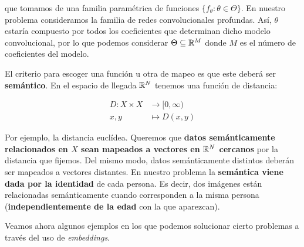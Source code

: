 que tomamos de una familia paramétrica de funciones $\{f_{\theta}: \theta \in \Theta \}$. En nuestro problema consideramos la familia de redes convolucionales profundas. Así, $\theta$ estaría compuesto por todos los coeficientes que determinan dicho modelo convolucional, por lo que podemos considerar $\Theta \subseteq \mathbb{R}^M$ donde $M$ es el número de coeficientes del modelo.

El criterio para escoger una función u otra de mapeo es que este deberá ser \textbf{semántico}. En el espacio de llegada $\mathbb{R}^N$ tenemos una función de distancia:

\begin{equation}
\begin{split}
    D: X \times X & \to [0, \infty) \\
    x, y & \mapsto D(x, y)
\end{split}
\end{equation}

Por ejemplo, la distancia euclídea. Queremos que \textbf{datos semánticamente relacionados en $X$ sean mapeados a vectores en $\mathbb{R}^N$ cercanos} por la distancia que fijemos. Del mismo modo, datos semánticamente distintos deberán ser mapeados a vectores distantes. En nuestro problema la \textbf{semántica viene dada por la identidad} de cada persona. Es decir, dos imágenes están relacionadas semánticamente cuando corresponden a la misma persona (\textbf{independientemente de la edad} con la que aparezcan).

Veamos ahora algunos ejemplos en los que podemos solucionar cierto problemas a través del uso de \textit{embeddings}.

